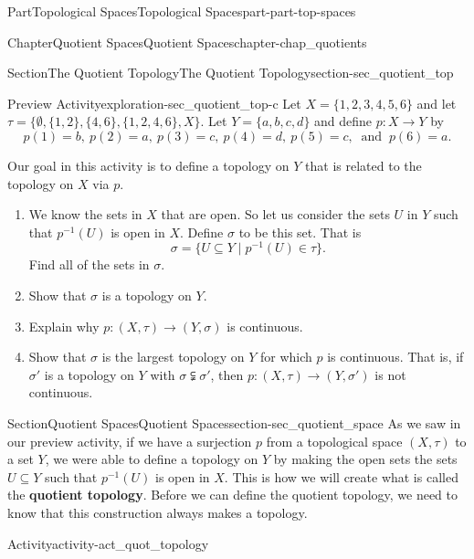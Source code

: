\documentclass[oneside,10pt,]{book}
\newcommand{\terminology}[1]{\textbf{#1}}
\numberwithin{equation}{chapter}
\begin{document}
\begin{partptx}{Part}{Topological Spaces}{}{Topological Spaces}{}{}{part-part-top-spaces}
\begin{chapterptx}{Chapter}{Quotient Spaces}{}{Quotient Spaces}{}{}{chapter-chap_quotients}
\begin{sectionptx}{Section}{The Quotient Topology}{}{The Quotient Topology}{}{}{section-sec_quotient_top}
\begin{exploration}{Preview Activity}{}{exploration-sec_quotient_top-c}%
Let \(X = \{1,2,3,4,5,6\}\) and let \(\tau = \{\emptyset, \{1,2\},\{4,6\}, \{1,2,4,6\},X\}\). Let \(Y = \{a,b,c,d\}\) and define \(p: X \to Y\) by%
\begin{equation*}
p(1) = b, \ p(2) = a, \ p(3) = c, \ p(4) = d, \ p(5) = c, \ \text{ and }  \ p(6) = a\text{.}
\end{equation*}
%
\par
Our goal in this activity is to define a topology on \(Y\) that is related to the topology on \(X\) via \(p\).%
\begin{enumerate}[font=\bfseries,label=(\alph*),ref=\alph*]%
\item{}We know the sets in \(X\) that are open. So let us consider the sets \(U\) in \(Y\) such that \(p^{-1}(U)\) is open in \(X\). Define \(\sigma\) to be this set. That is%
\begin{equation*}
\sigma = \{U \subseteq Y \mid p^{-1}(U) \in \tau\}\text{.}
\end{equation*}
Find all of the sets in \(\sigma\).%
\item{}Show that \(\sigma\) is a topology on \(Y\).%
\item{}Explain why \(p : (X, \tau) \to (Y, \sigma)\) is continuous.%
\item{}Show that \(\sigma\) is the largest topology on \(Y\) for which \(p\) is continuous. That is, if \(\sigma'\) is a topology on \(Y\) with \(\sigma \subsetneqq \sigma'\), then \(p: (X,\tau) \to (Y, \sigma')\) is not continuous.%
\end{enumerate}%
\end{exploration}%
\end{sectionptx}
%
%
\typeout{************************************************}
\typeout{************************************************}
%
\begin{sectionptx}{Section}{Quotient Spaces}{}{Quotient Spaces}{}{}{section-sec_quotient_space}
As we saw in our preview activity, if we have a surjection \(p\) from a topological space \((X,\tau)\) to a set \(Y\), we were able to define a topology on \(Y\) by making the open sets the sets \(U \subseteq Y\) such that \(p^{-1}(U)\) is open in \(X\). This is how we will create what is called the \terminology{quotient topology}. Before we can define the quotient topology, we need to know that this construction always makes a topology.%
\begin{activity}{Activity}{}{activity-act_quot_topology}%

\end{activity}
\end{sectionptx}
\end{chapterptx}
\end{partptx}
\end{document}
